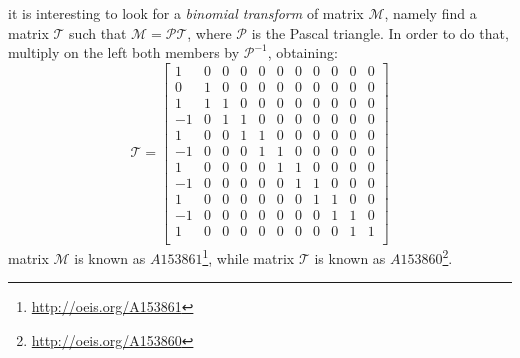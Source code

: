 \documentclass[a4paper,dottedtoc,headinclude,footinclude]{report} %
\theoremstyle{plain}
\begin{document}
    it is interesting to look for a \emph{binomial transform} of
    matrix $\mathcal{M}$, namely find a matrix $\mathcal{T}$ such that
    $\mathcal{M} = \mathcal{P}\mathcal{T}$, where $\mathcal{P}$ is 
    the Pascal triangle. In order to do that, multiply on the left
    both members by $\mathcal{P}^{-1}$, obtaining:
    \begin{displaymath}
        \mathcal{T} = \left[\begin{array}{ccccccccccc}
            1 & 0 & 0 & 0 & 0 & 0 & 0 & 0 & 0 & 0 & 0\\
            0 & 1 & 0 & 0 & 0 & 0 & 0 & 0 & 0 & 0 & 0\\
            1 & 1 & 1 & 0 & 0 & 0 & 0 & 0 & 0 & 0 & 0\\
            -1 & 0 & 1 & 1 & 0 & 0 & 0 & 0 & 0 & 0 & 0\\
            1 & 0 & 0 & 1 & 1 & 0 & 0 & 0 & 0 & 0 & 0\\
            -1 & 0 & 0 & 0 & 1 & 1 & 0 & 0 & 0 & 0 & 0\\
            1 & 0 & 0 & 0 & 0 & 1 & 1 & 0 & 0 & 0 & 0\\
            -1 & 0 & 0 & 0 & 0 & 0 & 1 & 1 & 0 & 0 & 0\\
            1 & 0 & 0 & 0 & 0 & 0 & 0 & 1 & 1 & 0 & 0\\
            -1 & 0 & 0 & 0 & 0 & 0 & 0 & 0 & 1 & 1 & 0\\
            1 & 0 & 0 & 0 & 0 & 0 & 0 & 0 & 0 & 1 & 1\\
        \end{array}\right]
    \end{displaymath}
    matrix $\mathcal{M}$ is known as $A153861$\footnote{\url{http://oeis.org/A153861}},
    while matrix $\mathcal{T}$ is known as $A153860$\footnote{\url{http://oeis.org/A153860}}.
\end{document}
